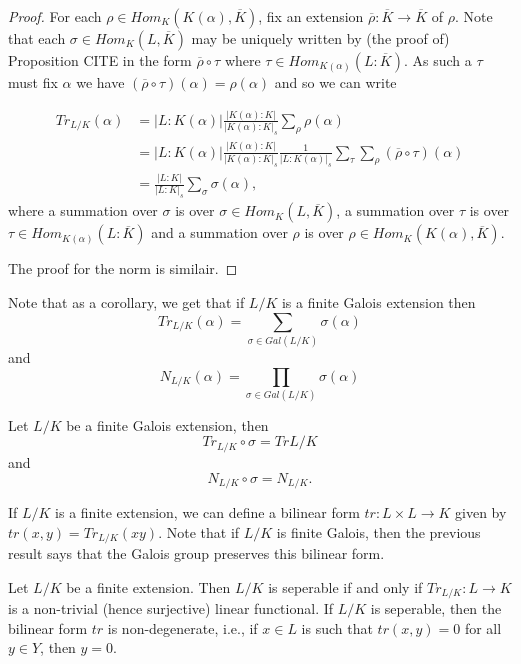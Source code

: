 \documentclass[twoside, a4paper, 10pt]{amsart}
\begin{document}
\begin{proof} For each $\rho \in Hom_{K}(K(\alpha), \overline{K})$, fix an extension $\overline{\rho}:\overline{K} \to \overline{K}$ of $\rho$. Note that each $\sigma \in Hom_{K}(L, \overline{K})$ may be uniquely written by (the proof of) Proposition CITE in the form $\overline{\rho} \circ \tau$ where $\tau \in Hom_{K(\alpha)}(L : \overline{K})$. As such a $\tau$ must fix $\alpha$ we have $(\overline{\rho} \circ \tau) (\alpha) = \rho(\alpha)$ and so we can write 

\begin{align*}Tr_{L/K}(\alpha) &= |L:K(\alpha)| \frac{|K(\alpha):K|}{|K(\alpha):K|_s} \sum_{\rho} \rho(\alpha) \\ 
&= |L:K(\alpha)| \frac{|K(\alpha):K|}{|K(\alpha):K|_s} \frac{1}{|L:K(\alpha)|_s} \sum_{\tau} \sum_{\rho} (\overline{\rho} \circ \tau)(\alpha) \\
&= \frac{|L:K|}{|L:K|_s} \sum_{\sigma} \sigma(\alpha), \end{align*} where a summation over $\sigma$ is over $\sigma \in  Hom_{K}(L, \overline{K})$, a summation over $\tau$ is over $ \tau \in Hom_{K(\alpha)}(L : \overline{K})$ and a summation over $\rho$ is over  $\rho \in Hom_{K}(K(\alpha), \overline{K})$.

The proof for the norm is similair.\end{proof}

Note that as a corollary, we get that if $L/K$ is a finite Galois extension then $$Tr_{L/K}(\alpha) = \sum_{\sigma \in Gal(L/K)} \sigma(\alpha)$$ and  $$N_{L/K}(\alpha) = \prod_{\sigma \in Gal(L/K)} \sigma(\alpha)$$
\begin{corol} Let $L/K$ be a finite Galois extension, then $$Tr_{L/K} \circ \sigma = Tr{L/K}$$ and $$N_{L/K} \circ \sigma = N_{L/K}.$$

\end{corol}

If $L/K$ is a finite extension, we can define a bilinear form $tr:L \times L \to K$ given by $tr(x,y) = Tr_{L/K}(xy)$. Note that if $L/K$ is finite Galois, then the previous result says that the Galois group preserves this bilinear form.

\begin{prop} Let $L/K$ be a finite extension. Then $L/K$ is seperable if and only if $Tr_{L/K}:L \to K$ is a non-trivial (hence surjective) linear functional. If $L/K$ is seperable, then the bilinear form $tr$ is non-degenerate, i.e., if $x \in L$ is such that $tr(x,y) = 0$ for all $y \in Y$, then $y=0$.

\end{prop}
\end{document}
